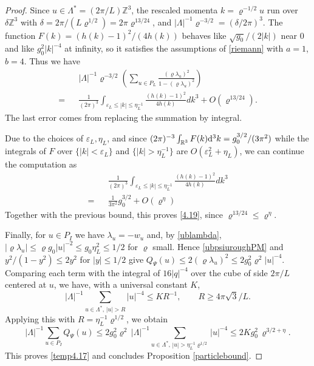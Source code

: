 \documentclass[11pt]{article}
\numberwithin{equation}{section}
\newcommand{\rd}{{\rm d}}
\newcommand{\beq}{\begin{equation}}
\newcommand{\eeq}{\end{equation}}
\newcommand{\beqa}{\begin{eqnarray}}
\newcommand{\eeqa}{\end{eqnarray}}
\newcommand\Z{{\mathbb Z}}
\newcommand\R{{\mathbb R}}
\newcommand\eps{\varepsilon}
\renewcommand\rho\varrho
\theoremstyle{definition}
\begin{document}
\begin{proof}
\smallskip
Since $u\in\Lambda^*=(2\pi/L)\Z^3$, the rescaled momenta $k=\rho^{-1/2}u$ run over $\delta\Z^3$ with $\delta=2\pi/(L\rho^{1/2})=2\pi\rho^{13/24}$, and $|\Lambda|^{-1}\rho^{-3/2}=(\delta/2\pi)^3$. The function $F(k)=(h(k)-1)^2/(4h(k))$ behaves like $\sqrt{g_0}/(2|k|)$ near $0$ and like $g_0^2|k|^{-4}$ at infinity, so it satisfies the assumptions of \eqref{riemann} with $a=1$, $b=4$.
Thus we have
\beqa\label{3.1}
&&|\Lambda|^{-1}\rho^{-3/2}\left(\sum_{u\in P_L}\frac{(\rho\lambda_u)^2}{1-(\rho\lambda_u)^2}\right) \nonumber \\
=  &&\frac{1}{(2\pi)^3}
\int_{\eps_L\leq |k|\leq \eta_L^{-1}}
\frac{(h(k)-1)^2}{4h(k)}dk^3 +  O(\rho^{13/24})  .
\eeqa
The last error comes from replacing the summation by integral.




Due to the choices of  $\eps_L, \eta_L$, and since $(2\pi)^{-3}\int_{\R^3}F(k)\rd^3k=g_0^{3/2}/(3\pi^2)$ while the integrals of $F$ over $\{|k|<\eps_L\}$ and $\{|k|>\eta_L^{-1}\}$ are $O(\eps_L^2+\eta_L)$,
we can continue the computation as
\beqa\label{sum}
  &&\frac{1}{(2\pi)^3}
\int_{\eps_L\leq |k|\leq \eta_L^{-1}}
\frac{(h(k)-1)^2}{4h(k)}dk^3  \nonumber \\
=  &&\frac{1}{3\pi^2}g^{3/2}_0  +  O(\rho^{\eta})
\eeqa
Together with the previous bound, this proves \eqref{4.19},
since $\rho^{13/24}\leq\rho^{\eta}$.



Finally, for $u \in P_{I}$ we have $\lambda_u=-w_u$ and, by \eqref{ublambda}, $|\rho\lambda_u|\leq \rho g_0|u|^{-2}\leq g_0\eta_L^2\leq 1/2$ for $\rho$ small. Hence \eqref{ubpsiuroughPM} and $y^2/(1-y^2)\leq 2y^2$ for $|y|\leq 1/2$ give $Q_\Psi(u)\leq 2(\rho\lambda_u)^2\leq 2g_0^2\rho^2|u|^{-4}$. Comparing each term with the integral of $16|q|^{-4}$ over the cube of side $2\pi/L$ centered at $u$, we have, with a universal constant $K$, 
\[
|\Lambda|^{-1}\sum_{u\in\Lambda^*,\,|u|>R}|u|^{-4}\leq KR^{-1},\qquad R\geq 4\pi\sqrt3/L .
\]
Applying this with $R=\eta_L^{-1}\rho^{1/2}$, we obtain
\beq
|\Lambda|^{-1}\sum_{u\in P_I}Q_\Psi(u)\leq 2g_0^2\rho^2\,|\Lambda|^{-1}\sum_{u\in\Lambda^*,\,|u|>\eta_L^{-1}\rho^{1/2}}|u|^{-4}\leq 2Kg_0^2\,\rho^{3/2+\eta} .
\eeq
This proves \eqref{temp4.17} and concludes Proposition \ref{particlebound}.


\end{proof}
\end{document}
